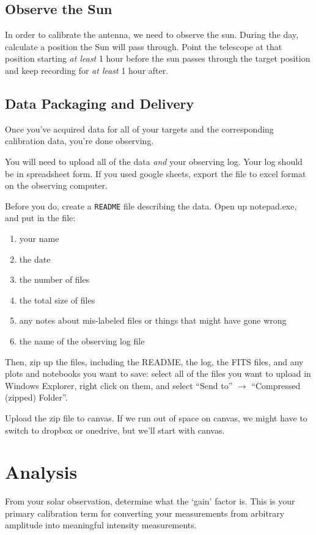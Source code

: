 \documentclass[11pt]{article}
\begin{document}
\subsection{Observe the Sun}
In order to calibrate the antenna, we need to observe the sun.  During the day,
calculate a position the Sun will pass through.  Point the telescope at that
position starting \emph{at least} 1 hour before the sun passes through the
target position and keep recording for \emph{at least} 1 hour after.


\subsection{Data Packaging and Delivery}
Once you've acquired data for all of your targets and the corresponding calibration data, you're done observing.

You will need to upload all of the data \emph{and} your observing log.
Your log should be in spreadsheet form.  If you used
google sheets, export the file to excel format on the observing computer.

Before you do, create a \texttt{README} file describing the data.  Open up notepad.exe,
and put in the file:
\begin{enumerate}
    \item your name
    \item the date
    \item the number of files
    \item the total size of files
    \item any notes about mis-labeled files or things that might have gone wrong
    \item the name of the observing log file
\end{enumerate}

Then, zip up the files, including the README, the log, the FITS files, and any plots
and notebooks you want to save:
select all of the files you want to upload in Windows Explorer, right click on
them, and select ``Send to'' $\rightarrow$ ``Compressed (zipped) Folder''.

Upload the zip file to canvas.  If we run out of space on canvas, we might have
to switch to dropbox or onedrive, but we'll start with canvas.


\section{Analysis}

From your solar observation, determine what the `gain' factor is.  This is your primary
calibration term for converting your measurements from arbitrary amplitude into meaningful
intensity measurements.
\end{document}
